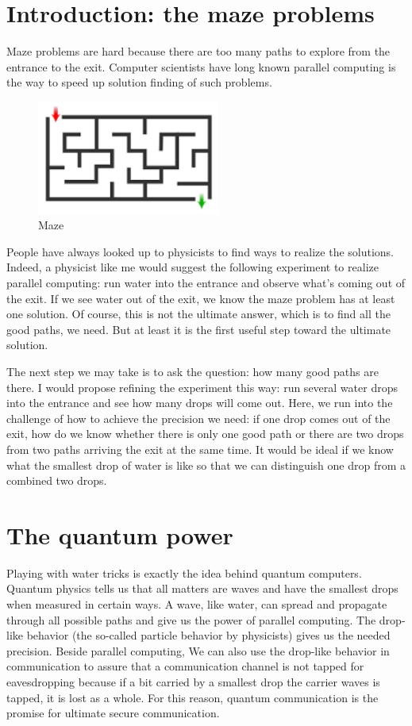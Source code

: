 \documentclass{book}
\begin{document}
\section{Introduction: the maze problems}
Maze problems are hard because there are too many paths to explore from the entrance to the exit. Computer scientists have long known parallel computing is the way to speed up solution finding of such problems.

\begin{figure}[ht]
\includegraphics[width=6cm]{pic/maze.png}
\caption{Maze}
\label{Maze}
\end{figure}

People have always looked up to physicists to find ways to realize the solutions. Indeed, a physicist like me would suggest the following experiment to realize parallel computing: run water into the entrance and observe what's coming out of the exit. If we see water out of the exit, we know the maze problem has at least one solution. Of course, this is not the ultimate answer, which is to find all the good paths, we need. But at least it is the first useful step toward the ultimate solution.

The next step we may take is to ask the question: how many good paths are there. I would propose refining the experiment this way: run several water drops into the entrance and see how many drops will come out. Here, we run into the challenge of how to achieve the precision we need: if one drop comes out of the exit, how do we know whether there is only one good path or there are two drops from two paths arriving the exit at the same time. It would be ideal if we know what the smallest drop of water is like so that we can distinguish one drop from a combined two drops.

\section{The quantum power}
Playing with water tricks is exactly the idea behind quantum computers. Quantum physics tells us that all matters are waves and have the smallest drops when measured in certain ways. A wave, like water, can spread and propagate through all possible paths and give us the power of parallel computing. The drop-like behavior (the so-called particle behavior by physicists) gives us the needed precision. Beside parallel computing, We can also use the drop-like behavior in communication to assure that a communication channel is not tapped for eavesdropping because if a bit carried by a smallest drop the carrier waves is tapped, it is lost as a whole. For this reason, quantum communication is the promise for ultimate secure communication.
\end{document}

